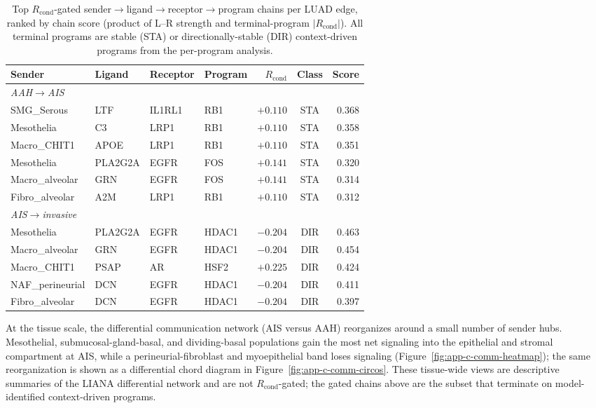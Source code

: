 \begin{table}[htbp]
  \centering
  \caption[Top R\textsubscript{cond}-gated communication chains]{Top $R_{\mathrm{cond}}$-gated
  sender$\rightarrow$ligand$\rightarrow$receptor$\rightarrow$program chains per LUAD edge, ranked by
  chain score (product of L--R strength and terminal-program $|R_{\mathrm{cond}}|$). All terminal
  programs are stable (STA) or directionally-stable (DIR) context-driven programs from the per-program
  analysis.}
  \label{tab:app-c-comm-chains}
  \footnotesize
  \begin{tabular}{llllrcr}
    \toprule
    Sender & Ligand & Receptor & Program & $R_{\mathrm{cond}}$ & Class & Score \\
    \midrule
    \multicolumn{7}{l}{\emph{AAH$\rightarrow$AIS}} \\
    SMG\_Serous & LTF & IL1RL1 & RB1 & $+0.110$ & STA & 0.368 \\
    Mesothelia & C3 & LRP1 & RB1 & $+0.110$ & STA & 0.358 \\
    Macro\_CHIT1 & APOE & LRP1 & RB1 & $+0.110$ & STA & 0.351 \\
    Mesothelia & PLA2G2A & EGFR & FOS & $+0.141$ & STA & 0.320 \\
    Macro\_alveolar & GRN & EGFR & FOS & $+0.141$ & STA & 0.314 \\
    Fibro\_alveolar & A2M & LRP1 & RB1 & $+0.110$ & STA & 0.312 \\
    \midrule
    \multicolumn{7}{l}{\emph{AIS$\rightarrow$invasive}} \\
    Mesothelia & PLA2G2A & EGFR & HDAC1 & $-0.204$ & DIR & 0.463 \\
    Macro\_alveolar & GRN & EGFR & HDAC1 & $-0.204$ & DIR & 0.454 \\
    Macro\_CHIT1 & PSAP & AR & HSF2 & $+0.225$ & DIR & 0.424 \\
    NAF\_perineurial & DCN & EGFR & HDAC1 & $-0.204$ & DIR & 0.411 \\
    Fibro\_alveolar & DCN & EGFR & HDAC1 & $-0.204$ & DIR & 0.397 \\
    \bottomrule
  \end{tabular}
\end{table}

At the tissue scale, the differential communication network (AIS versus AAH) reorganizes around a
small number of sender hubs. Mesothelial, submucosal-gland-basal, and dividing-basal populations gain
the most net signaling into the epithelial and stromal compartment at AIS, while a perineurial-fibroblast
and myoepithelial band loses signaling (Figure~\ref{fig:app-c-comm-heatmap}); the same reorganization is
shown as a differential chord diagram in Figure~\ref{fig:app-c-comm-circos}. These tissue-wide views are
descriptive summaries of the LIANA differential network and are not $R_{\mathrm{cond}}$-gated; the gated
chains above are the subset that terminate on model-identified context-driven programs.

